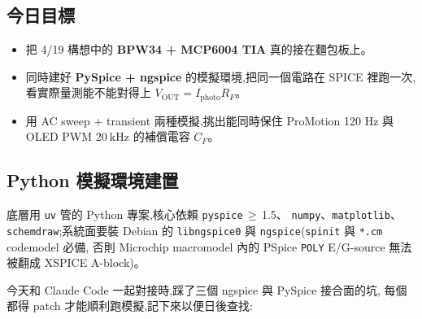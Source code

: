 
\subsection*{今日目標}

\begin{itemize}[leftmargin=2em,itemsep=0pt]
  \item 把 4/19 構想中的 \textbf{BPW34 + MCP6004 TIA} 真的接在麵包板上。
  \item 同時建好 \textbf{PySpice + ngspice} 的模擬環境,把同一個電路在 SPICE 裡跑一次,
        看實際量測能不能對得上 \(V_\text{OUT} = I_\text{photo} R_F\)。
  \item 用 AC sweep + transient 兩種模擬,挑出能同時保住 ProMotion 120 Hz
        與 OLED PWM \(\SI{20}{\kilo\hertz}\) 的補償電容 \(C_F\)。
\end{itemize}

\subsection*{Python 模擬環境建置}

底層用 \texttt{uv} 管的 Python 專案,核心依賴 \texttt{pyspice}\,\(\geq\,\)1.5、
\texttt{numpy}、\texttt{matplotlib}、\texttt{schemdraw};系統面要裝 Debian 的
\texttt{libngspice0} 與 \texttt{ngspice}(\texttt{spinit} 與 \texttt{*.cm} codemodel 必備,
否則 Microchip macromodel 內的 PSpice \texttt{POLY} E/G-source 無法被翻成 XSPICE A-block)。

今天和 Claude Code 一起對接時,踩了三個 ngspice 與 PySpice 接合面的坑,
每個都得 patch 才能順利跑模擬,記下來以便日後查找:

